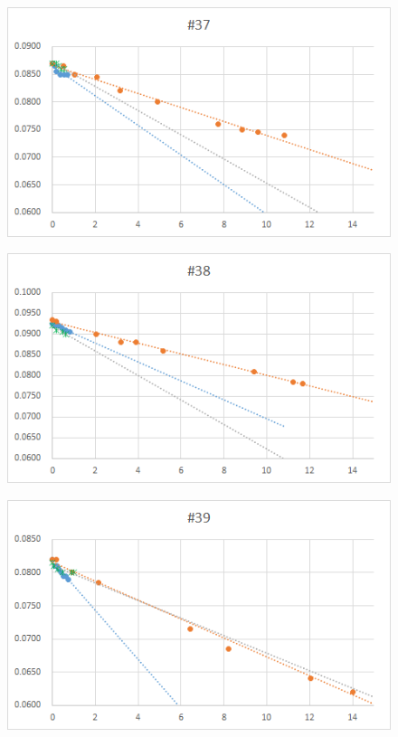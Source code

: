 \documentclass[12pt,a4paper]{jarticle}
\begin{document}
\begin{figure}[htbp]
  \centering
     \includegraphics[width=120mm]{vol_037.png}
\end{figure}
\begin{figure}[htbp]
  \centering
     \includegraphics[width=120mm]{vol_038.png}
\end{figure}
\begin{figure}[htbp]
  \centering
     \includegraphics[width=120mm]{vol_039.png}
\end{figure}
\end{document}
